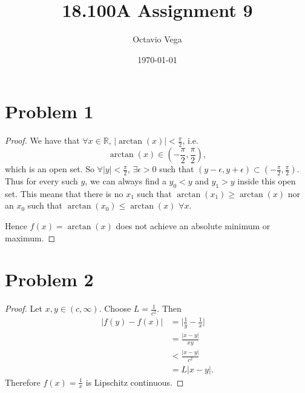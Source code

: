 \documentclass{article}
\title{18.100A Assignment 9}
\author{Octavio Vega}
\date\today
\newcommand{\R}{\mathbb{R}} %
\begin{document}
\maketitle

\section*{Problem 1}
\begin{proof}
	We have that $\forall x \in \R$, $|\arctan(x)| < \frac{\pi}{2}$, i.e.
	\begin{equation}
		\arctan(x) \in \left(-\frac{\pi}{2}, \frac{\pi}{2}\right),
	\end{equation}
	which is an open set. So $\forall |y| < \frac{\pi}{2}$, $\exists \epsilon > 0$ such that $(y - \epsilon, y + \epsilon) \subset (-\frac{\pi}{2}, \frac{\pi}{2})$. Thus for every such $y$, we can always find a $y_0 < y$ and $y_1 > y$ inside this open set. This means that there is no $x_1$ such that $\arctan(x_1) \geq \arctan(x)$ nor an $x_0$ such that $\arctan(x_0) \leq \arctan(x)$ $\forall x$.
	
	Hence $f(x) = \arctan(x)$ does not achieve an absolute minimum or maximum.
\end{proof}
\section*{Problem 2}
\begin{proof}
	Let $x, y \in (c, \infty)$. Choose $L = \frac{1}{c^2}$. Then
	\begin{align}
		|f(y) - f(x)| &= \Big|\frac{1}{y} - \frac{1}{x}\Big| \\
		&= \frac{|x - y|}{xy} \\
		&< \frac{|x - y|}{c^2} \\
		&= L |x - y|.
	\end{align}
	Therefore $f(x) = \frac{1}{x}$ is Lipschitz continuous.
\end{proof}
\end{document}
